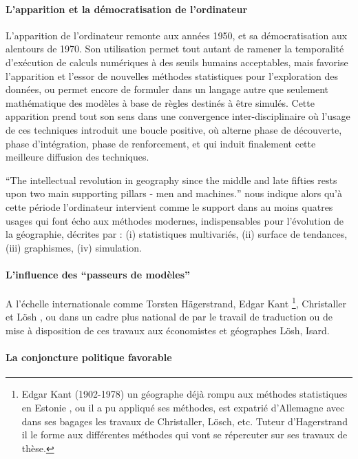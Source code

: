 {\paragraph{L'apparition et la démocratisation de l'ordinateur}

L'apparition de l'ordinateur remonte aux années 1950, et sa démocratisation aux alentours de 1970. Son utilisation permet tout autant de ramener la temporalité d'exécution de calculs numériques à des seuils humains acceptables, mais favorise l'apparition et l'essor de nouvelles méthodes statistiques pour l'exploration des données, ou permet encore de formuler dans un langage autre que seulement mathématique des modèles à base de règles destinés à être simulés. Cette apparition prend tout son sens dans une convergence inter-disciplinaire où l'usage de ces techniques introduit une boucle positive, où alterne phase de découverte, phase d'intégration, phase de renforcement, et qui induit finalement cette meilleure diffusion des techniques.

\foreignquote{english}{The intellectual revolution in geography since the middle and late fifties rests upon two main supporting pillars - men and machines.} \autocite{Gould1970,Haggett1969} nous indique alors qu'à cette période l'ordinateur intervient comme le support dans au moins quatres usages qui font écho aux méthodes modernes, indispensables pour l'évolution  de la géographie, décrites par \textcite{Claval1977} : (i) statistiques multivariés, (ii) surface de tendances, (iii) graphismes, (iv) simulation. 

\paragraph{L'influence des \enquote{passeurs de modèles}}

A l'échelle internationale comme Torsten Hägerstrand, Edgar Kant \footnote{Edgar Kant (1902-1978) un géographe déjà rompu aux méthodes statistiques en Estonie \autocite{Chabot1937} , ou il a pu appliqué ses méthodes, est expatrié d'Allemagne avec dans ses bagages les travaux de Christaller, Lösch, etc. Tuteur d'Hagerstrand il le forme aux différentes méthodes qui vont se répercuter sur ses travaux de thèse.}, Christaller et Lösh \autocite[119]{Berry1970}, ou dans un cadre plus national de par le travail de traduction ou de mise à disposition de ces travaux aux économistes et géographes Lösh, Isard.

\paragraph{La conjoncture politique favorable}

}
